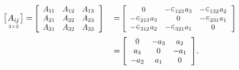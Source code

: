 \nopagebreak\vspace{-0.5em}
\begin{alignat*}{2}
\asmatrixwithdimensions{A_{i\hspace{-0.1ex}j}}{3}{3}
& = \hspace{-0.1em}
\scalebox{.9}{$\left[ \begin{array}{c@{\hspace{1em}}c@{\hspace{1em}}c}
A_{1\hspace{-0.1ex}1} & A_{12} & A_{13} \\
A_{21} & A_{22} & A_{23} \\
A_{31} & A_{32} & A_{33}
\end{array} \hspace{.25ex}\right]$}
\hspace{-0.3ex} && = \hspace{-0.3ex}
\scalebox{.88}{$\left[ \begin{array}{c@{\hspace{1em}}c@{\hspace{1em}}c}
0 & - \permutationsparitysymbols{123} \hspace{.1ex} a_3 & - \permutationsparitysymbols{132} \hspace{.1ex} a_2 \\
- \permutationsparitysymbols{213} \hspace{.1ex} a_3 & 0 & - \permutationsparitysymbols{231} a_1 \\
- \permutationsparitysymbols{312} \hspace{.1ex} a_2 & - \permutationsparitysymbols{321} a_1 & 0
\end{array} \hspace{.3ex}\right]$}
\\[.2em]
& && = \hspace{-0.1em}
\scalebox{.93}{$\left[ \begin{array}{ccc}
0 & - \hspace{-0.1ex} a_3 & a_2 \\
a_3 & 0 & - \hspace{-0.1ex} a_1 \\
- \hspace{-0.1ex} a_2 & a_1 & 0
\end{array} \hspace{.25ex}\right]$}
.
\end{alignat*}

